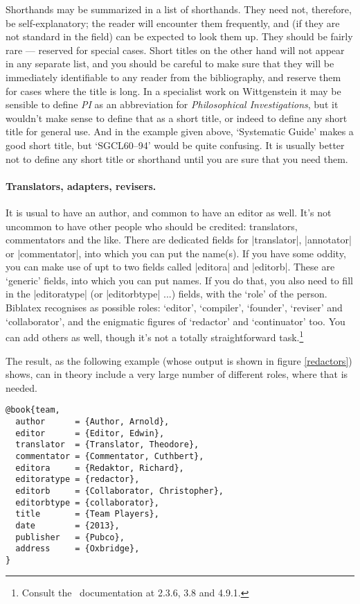 {Shorthands may be summarized in a list of shorthands. They need not, therefore, be self-explanatory; the reader will encounter them frequently, and (if they are not standard in the field) can be expected to look them up. They should be fairly rare --- reserved for special cases. Short titles on the other hand will not appear in any separate list, and you should be careful to make sure that they will be immediately identifiable to any reader from the bibliography, and reserve them for cases where the title is long. In a specialist work on Wittgenstein it may be sensible to define \emph{PI} as an abbreviation for \emph{Philosophical Investigations}, but it wouldn't make sense to define that as a short title, or indeed to define any short title for general use. And in the example given above, `Systematic Guide' makes a good short title, but `SGCL60--94' would be quite confusing. It is usually better not to define any short title or shorthand until you are sure that you need them.

\paragraph{Translators, adapters, revisers.} It is usual to have an author, and common to have an editor as well. It's not uncommon to have other people who should be credited: translators, commentators and the like. There are dedicated fields for |translator|, |annotator| or |commentator|, into which you can put the name(s). If you have some oddity, you can make use of upt to two fields called |editora| and |editorb|. These are `generic' fields, into which you can put names. If you do that, you also need to fill in the |editoratype| (or |editorbtype| ...) fields, with the `role' of the person. Biblatex recognises as possible roles: `editor', `compiler', `founder', `reviser' and `collaborator', and the enigmatic figures of `redactor' and `continuator' too. You can add others as well, though it's not a totally straightforward task.\footnote{Consult the \biblatex\ documentation at 2.3.6, 3.8 and 4.9.1.}

The result, as the following example (whose output is shown in figure \ref{redactors}) shows, can in theory include a very large number of different roles, where that is needed.

\begin{verbatim}
@book{team,
  author      = {Author, Arnold},
  editor      = {Editor, Edwin},
  translator  = {Translator, Theodore},
  commentator = {Commentator, Cuthbert},
  editora     = {Redaktor, Richard},
  editoratype = {redactor},
  editorb     = {Collaborator, Christopher},
  editorbtype = {collaborator},
  title       = {Team Players},
  date        = {2013},
  publisher   = {Pubco},
  address     = {Oxbridge},
}
\end{verbatim}

}
